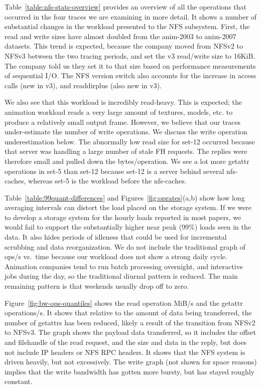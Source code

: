 Table~\ref{table:nfs-stats-overview} provides an overview of all the
operations that occurred in the four traces we are examining in more
detail.  It shows a number of substantial changes in the workload
presented to the NFS subsystem.  First, the read and write sizes have
almost doubled from the anim-2003 to anim-2007 datasets.  This trend is expected,
because the company moved from NFSv2 to NFSv3 between the two
tracing periods, and set the v3 read/write size to 16KiB.  The company told
us they set it to that size based on performance
measurements of sequential I/O.  The NFS version switch also accounts
for the increase in access calls (new in v3), and readdirplus (also
new in v3).  

We also see that this workload is incredibly read-heavy.  This is
expected; the animation workload reads a very large amount of
textures, models, etc. to produce a relatively small output frame.
However, we believe that our traces under-estimate the number of write
operations.  We discuss the write operation underestimation below.
The abnormally low read size for set-12 occurred because
that server was handling a large number of stale FH requests.  The
replies were therefore small and pulled down the bytes/operation.  We
see a lot more getattr operations in set-5 than set-12 because set-12
is a server behind several nfs-caches, whereas set-5 is the workload
before the nfs-caches.

Table~\ref{table:99quant-differences} and
Figures~\ref{fig:oprates}(a,b) show how long averaging intervals can
distort the load placed on the storage system.  If we were to develop
a storage system for the hourly loads reported in most papers, we
would fail to support the substantially higher near peak (99\%) loads
seen in the data.  It also hides periods of idleness that could be
used for incremental scrubbing and data reorganization.  We do not
include the traditional graph of ops/s vs.\ time because our workload
does not show a strong daily cycle.  Animation companies tend to run
batch processing overnight, and interactive jobs during the day, so
the traditional diurnal pattern is reduced.  The main remaining
pattern is that weekends usually drop off to zero.

Figure~\ref{fig:bw-ops-quantiles} shows the read operation MiB/s and
the getattr operations/s.  It shows that relative to the amount of
data being transferred, the number of getattrs has been reduced,
likely a result of the transition from NFSv2 to NFSv3.  The graph
shows the payload data transferred, so it includes the offset and
filehandle of the read request, and the size and data in the reply,
but does not include IP headers or NFS RPC headers.  It shows that the
NFS system is driven heavily, but not excessively. The write graph
(not shown for space reasons) implies that the write bandwidth has
gotten more bursty, but has stayed roughly constant.


